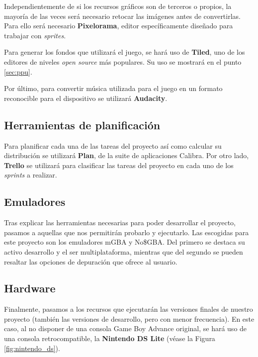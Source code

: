 Independientemente de si los recursos gráficos son de terceros o propios, la mayoría de las veces será necesario retocar las imágenes antes de convertirlas. Para ello será necesario \textbf{Pixelorama}, editor específicamente diseñado para trabajar con \textit{sprites}.

Para generar los fondos que utilizará el juego, se hará uso de \textbf{Tiled}, uno de los editores de niveles \textit{open source} más populares. Su uso se mostrará en el punto \ref{sec:ppu}.

Por último, para convertir música utilizada para el juego en un formato reconocible para el dispositivo se utilizará \textbf{Audacity}.

\subsection{Herramientas de planificación}
Para planificar cada una de las tareas del proyecto así como calcular su distribución se utilizará \textbf{Plan}, de la suite de aplicaciones Calibra. Por otro lado, \textbf{Trello} se utilizará para clasificar las tareas del proyecto en cada uno de los \textit{sprints} a realizar.

\subsection{Emuladores}
Tras explicar las herramientas necesarias para poder desarrollar el proyecto, pasamos a aquellas que nos permitirán probarlo y ejecutarlo. Las escogidas para este proyecto son los emuladores mGBA y No\$GBA. Del primero se destaca su activo desarrollo y el ser multiplataforma, mientras que del segundo se pueden resaltar las opciones de depuración que ofrece al usuario.


\subsection{Hardware}
Finalmente, pasamos a los recursos que ejecutarán las versiones finales de nuestro proyecto (también las versiones de desarrollo, pero con menor frecuencia). En este caso, al no disponer de una consola Game Boy Advance original, se hará uso de una consola retrocompatible, la \textbf{Nintendo DS Lite} (véase la Figura \ref{fig:nintendo_ds}).

